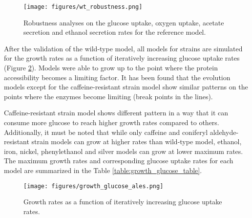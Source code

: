 \begin{figure}[H]
  \begin{center}
  \texttt{[image: figures/wt\_robustness.png]}
  \caption[Robustness analyses on the glucose uptake, oxygen uptake, acetate secretion and ethanol secretion rates for the reference model]{Robustness analyses on the glucose uptake, oxygen uptake, acetate secretion and ethanol secretion rates for the reference model.}
  \label{fig:wt_robustness}
  \end{center}
\end{figure}

\vspace{-1cm}

After the validation of the wild-type model, all models for strains are simulated for the growth rates as a function of iteratively increasing glucose uptake rates (Figure \ref{fig:growth_glucose_ales}). Models were able to grow up to the point where the protein accessibility becomes a limiting factor. It has been found that the evolution models except for the caffeine-resistant strain model show similar patterns on the points where the enzymes become limiting (break points in the lines).

Caffeine-resistant strain model shows different pattern in a way that it can consume more glucose to reach higher growth rates compared to others. Additionally, it must be noted that while only caffeine and coniferyl aldehyde-resistant strain models can grow at higher rates than wild-type model, ethanol, iron, nickel, phenylethanol and silver models can grow at lower maximum rates. The maximum growth rates and corresponding glucose uptake rates for each model are summarized in the Table \ref{table:growth_glucose_table}.

\begin{figure}[H]
  \begin{center}
  \texttt{[image: figures/growth\_glucose\_ales.png]}
  \caption[Growth rates as a function of iteratively increasing glucose uptake rates]{Growth rates as a function of iteratively increasing glucose uptake rates.}
  \label{fig:growth_glucose_ales}
  \end{center}
  \end{figure}

\vspace{-1.0cm}



\vspace{-1cm}

